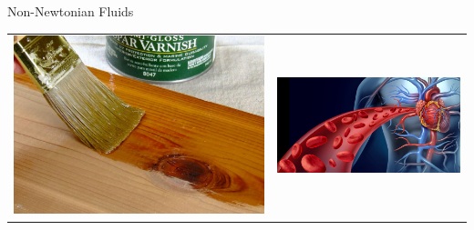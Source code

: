 \documentclass[pdf]{beamer}
\begin{document}
\begin{frame}{Non-Newtonian Fluids}
\begin{table}
\begin{tabular}{cc}
    \includegraphics[width=\pw, height=\ph, keepaspectratio]{figs/varnish} & \includegraphics[width=\pw, height=\ph, keepaspectratio]{figs/blood-circulation}
\end{tabular}
\end{table}
\end{frame}
\end{document}
